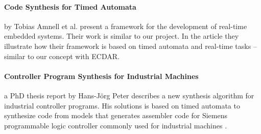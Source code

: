 \paragraph{Code Synthesis for Timed Automata}
by Tobias Amnell et al. present a framework for the development of real-time
embedded systems\cite{Amnell:2002:CST:779110.779112}. Their work is similar to
our project. In the article they illustrate how their framework is based on timed
automata and real-time tasks -- similar to our concept with ECDAR.

\paragraph{Controller Program Synthesis for Industrial Machines}
a PhD thesis report by Hans-Jörg Peter describes a new synthesis algorithm for
industrial controller programs. His solutions is based on timed automata to
synthesize code from models that generates assembler code for Siemens
programmable logic controller commonly used for industrial
machines \cite{controller-program-synthesis:2005}.

